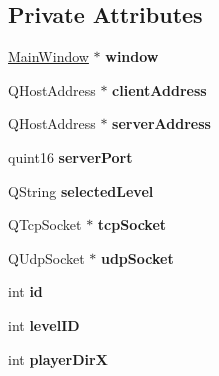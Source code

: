 \subsection*{Private Attributes}
\begin{DoxyCompactItemize}
\item 
\hypertarget{classClient_af8c1c7117e5948edee1558fc438b31ac}{
\hyperlink{classMainWindow}{MainWindow} $\ast$ {\bfseries window}}
\label{classClient_af8c1c7117e5948edee1558fc438b31ac}

\item 
\hypertarget{classClient_a40764e2c37b627ee9e8d4e2b2c6d449d}{
QHostAddress $\ast$ {\bfseries clientAddress}}
\label{classClient_a40764e2c37b627ee9e8d4e2b2c6d449d}

\item 
\hypertarget{classClient_a0db6298d221397a0264785d33638d670}{
QHostAddress $\ast$ {\bfseries serverAddress}}
\label{classClient_a0db6298d221397a0264785d33638d670}

\item 
\hypertarget{classClient_a91b4c05e1238c122efdef05979425a95}{
quint16 {\bfseries serverPort}}
\label{classClient_a91b4c05e1238c122efdef05979425a95}

\item 
\hypertarget{classClient_a2eeff66d384bd435437fec1468612c22}{
QString {\bfseries selectedLevel}}
\label{classClient_a2eeff66d384bd435437fec1468612c22}

\item 
\hypertarget{classClient_a7041cbe73e05ecbb881c6d5cf9ddfffb}{
QTcpSocket $\ast$ {\bfseries tcpSocket}}
\label{classClient_a7041cbe73e05ecbb881c6d5cf9ddfffb}

\item 
\hypertarget{classClient_aa5c3d320ef8fc938387bd0b8502f3c0a}{
QUdpSocket $\ast$ {\bfseries udpSocket}}
\label{classClient_aa5c3d320ef8fc938387bd0b8502f3c0a}

\item 
\hypertarget{classClient_ab79ad95264939f089a2f0b8e0ca62d37}{
int {\bfseries id}}
\label{classClient_ab79ad95264939f089a2f0b8e0ca62d37}

\item 
\hypertarget{classClient_ae05597d2e1b9244564c21c48d6562761}{
int {\bfseries levelID}}
\label{classClient_ae05597d2e1b9244564c21c48d6562761}

\item 
\hypertarget{classClient_a378696f650d41b3ca9523a96c6d56128}{
int {\bfseries playerDirX}}
\label{classClient_a378696f650d41b3ca9523a96c6d56128}


\end{DoxyCompactItemize}

